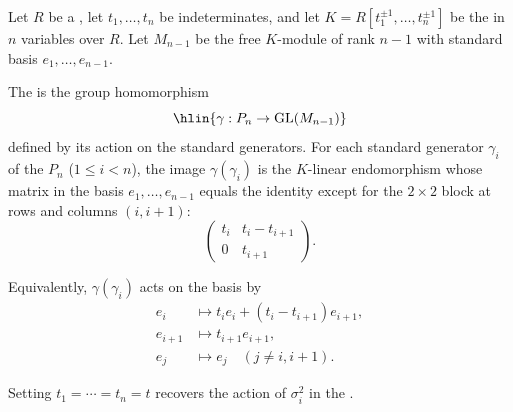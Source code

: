 \begin{definition} \label{definition:algebraic_Gassner_representation_of_pure_braid_group_on_a_module_over_a_ring}
    Let $R$ be a , let $t_1, \dots, t_n$ be indeterminates, and let $K = R[t_1^{\pm 1}, \dots, t_n^{\pm 1}]$ be the  in $n$ variables over $R$. Let $M_{n-1}$ be the free $K$-module of rank $n-1$ with standard basis $e_1, \dots, e_{n-1}$.

    The  is the group homomorphism
    $$\hlin{\gamma: P_n \to \operatorname{GL}(M_{n-1})}$$
    defined by its action on the standard generators. For each standard generator $\gamma_i$ of the  $P_n$ ($1 \leq i < n$), the image $\gamma(\gamma_i)$ is the $K$-linear endomorphism whose matrix in the basis $e_1, \dots, e_{n-1}$ equals the identity except for the $2 \times 2$ block at rows and columns $(i, i+1)$:
    $$\begin{pmatrix} t_i & t_i - t_{i+1} \\ 0 & t_{i+1} \end{pmatrix}.$$

    Equivalently, $\gamma(\gamma_i)$ acts on the basis by
    \begin{align*}
        e_i &\mapsto t_i e_i + (t_i - t_{i+1})e_{i+1}, \\
        e_{i+1} &\mapsto t_{i+1} e_{i+1}, \\
        e_j &\mapsto e_j \quad (j \neq i, i+1).
    \end{align*}

    Setting $t_1 = \cdots = t_n = t$ recovers the action of $\sigma_i^2$ in the .
\end{definition}
